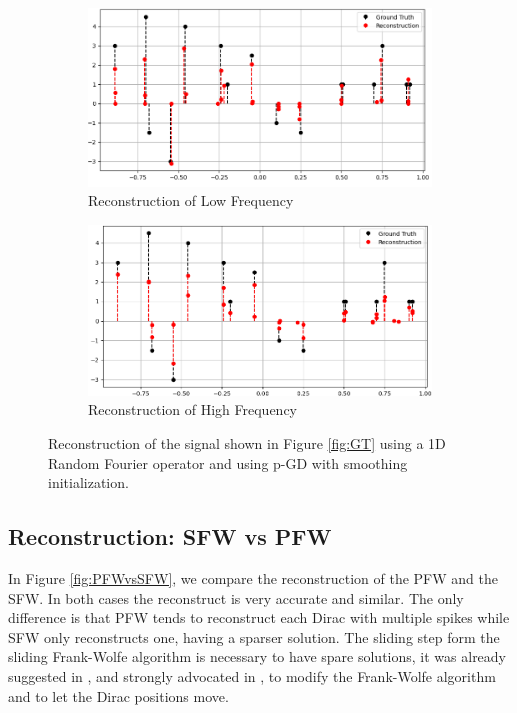 \documentclass[a4paper,12pt,oneside]{report}
\theoremstyle{named}
\begin{document}
\begin{figure}
\centering
\begin{subfigure}[b]{1\textwidth}
   \includegraphics[width=1\linewidth]{smoothing_low.png}
   \caption{Reconstruction of Low Frequency}
   \label{fig:smoothing_low} 
\end{subfigure}

\begin{subfigure}[b]{1\textwidth}
   \includegraphics[width=1\linewidth]{smoothing_high.png}
   \caption{Reconstruction of High Frequency}
   \label{fig:smoothing_high} 
\end{subfigure}

\caption{Reconstruction of the signal shown in Figure \ref{fig:GT} using a 1D Random Fourier operator and using p-GD with smoothing initialization.}
\label{fig:smoothing_reconstruction}
\end{figure}

\subsection{Reconstruction: SFW vs PFW}

In Figure \ref{fig:PFWvsSFW}, we compare the reconstruction of the PFW and the SFW. In both cases the reconstruct is very accurate and similar. The only difference is that PFW tends to reconstruct each Dirac with multiple spikes while SFW only reconstructs one, having a sparser solution. The sliding step form the sliding Frank-Wolfe algorithm is necessary to have spare solutions, it was already suggested in \cite{Bredies2012}, and strongly advocated in \cite{Boyd2015}, to modify the Frank-Wolfe algorithm and to let the Dirac positions move.\\
\end{document}
